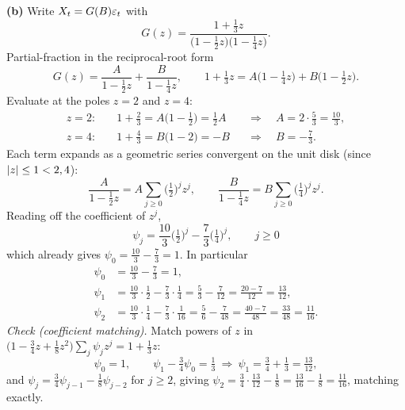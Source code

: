 \documentclass[11pt]{article}
\begin{document}
\textbf{(b)} Write $X_t=G(B)\varepsilon_t$ with
\[
G(z)=\frac{1+\tfrac13 z}{\big(1-\tfrac12 z\big)\big(1-\tfrac14 z\big)} .
\]
Partial-fraction in the reciprocal-root form
\[
G(z)=\frac{A}{1-\tfrac12 z}+\frac{B}{1-\tfrac14 z},
\qquad
1+\tfrac13 z=A\Big(1-\tfrac14 z\Big)+B\Big(1-\tfrac12 z\Big).
\]
Evaluate at the poles $z=2$ and $z=4$:
\[
\begin{aligned}
z=2:\quad &1+\tfrac23=A\Big(1-\tfrac12\Big)=\tfrac12 A
&&\Rightarrow\quad A=2\cdot\tfrac53=\tfrac{10}{3},\\
z=4:\quad &1+\tfrac43=B\Big(1-2\Big)=-B
&&\Rightarrow\quad B=-\tfrac73 .
\end{aligned}
\]
Each term expands as a geometric series convergent on the unit disk (since
$\left\lvert z \right\rvert\le1<2,4$):
\[
\frac{A}{1-\tfrac12 z}=A\sum_{j\ge0}\Big(\tfrac12\Big)^j z^j,
\qquad
\frac{B}{1-\tfrac14 z}=B\sum_{j\ge0}\Big(\tfrac14\Big)^j z^j .
\]
Reading off the coefficient of $z^j$,
\[
\boxed{\;\psi_j=\frac{10}{3}\Big(\tfrac12\Big)^{j}-\frac{7}{3}\Big(\tfrac14\Big)^{j},\qquad j\ge0\;}
\]
which already gives $\psi_0=\tfrac{10}{3}-\tfrac73=1$. In particular
\[
\begin{aligned}
\psi_0&=\tfrac{10}{3}-\tfrac73=1,\\
\psi_1&=\tfrac{10}{3}\cdot\tfrac12-\tfrac73\cdot\tfrac14=\tfrac53-\tfrac{7}{12}=\tfrac{20-7}{12}=\tfrac{13}{12},\\
\psi_2&=\tfrac{10}{3}\cdot\tfrac14-\tfrac73\cdot\tfrac1{16}=\tfrac56-\tfrac{7}{48}=\tfrac{40-7}{48}=\tfrac{33}{48}=\tfrac{11}{16}.
\end{aligned}
\]
\textit{Check (coefficient matching).} Match powers of $z$ in
$\big(1-\tfrac34 z+\tfrac18 z^2\big)\sum_j\psi_j z^j=1+\tfrac13 z$:
\[
\psi_0=1,\qquad
\psi_1-\tfrac34\psi_0=\tfrac13\ \Rightarrow\ \psi_1=\tfrac34+\tfrac13=\tfrac{13}{12},
\]
and $\psi_j=\tfrac34\psi_{j-1}-\tfrac18\psi_{j-2}$ for $j\ge2$, giving
$\psi_2=\tfrac34\cdot\tfrac{13}{12}-\tfrac18=\tfrac{13}{16}-\tfrac18=\tfrac{11}{16}$,
matching exactly.
\end{document}
